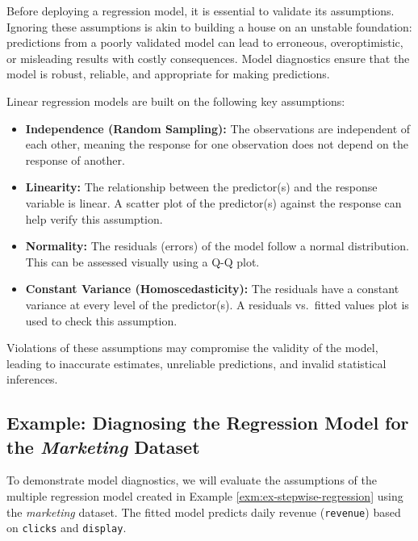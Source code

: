 \documentclass[
]{book}
\newcommand{\passthrough}[1]{#1}
\providecommand{\tightlist}{%
  \setlength{\itemsep}{0pt}\setlength{\parskip}{0pt}}
\theoremstyle{definition}
\theoremstyle{definition}
\theoremstyle{definition}
\theoremstyle{definition}
\theoremstyle{remark}
\begin{document}
Before deploying a regression model, it is essential to validate its assumptions. Ignoring these assumptions is akin to building a house on an unstable foundation: predictions from a poorly validated model can lead to erroneous, overoptimistic, or misleading results with costly consequences. Model diagnostics ensure that the model is robust, reliable, and appropriate for making predictions.

Linear regression models are built on the following key assumptions:

\begin{itemize}
\tightlist
\item
  \textbf{Independence (Random Sampling):} The observations are independent of each other, meaning the response for one observation does not depend on the response of another.\\
\item
  \textbf{Linearity:} The relationship between the predictor(s) and the response variable is linear. A scatter plot of the predictor(s) against the response can help verify this assumption.\\
\item
  \textbf{Normality:} The residuals (errors) of the model follow a normal distribution. This can be assessed visually using a Q-Q plot.\\
\item
  \textbf{Constant Variance (Homoscedasticity):} The residuals have a constant variance at every level of the predictor(s). A residuals vs.~fitted values plot is used to check this assumption.
\end{itemize}

Violations of these assumptions may compromise the validity of the model, leading to inaccurate estimates, unreliable predictions, and invalid statistical inferences.

\subsection{\texorpdfstring{Example: Diagnosing the Regression Model for the \emph{Marketing} Dataset}{Example: Diagnosing the Regression Model for the Marketing Dataset}}\label{example-diagnosing-the-regression-model-for-the-marketing-dataset}

To demonstrate model diagnostics, we will evaluate the assumptions of the multiple regression model created in Example \ref{exm:ex-stepwise-regression} using the \emph{marketing} dataset. The fitted model predicts daily revenue (\passthrough{\lstinline!revenue!}) based on \passthrough{\lstinline!clicks!} and \passthrough{\lstinline!display!}.
\end{document}
